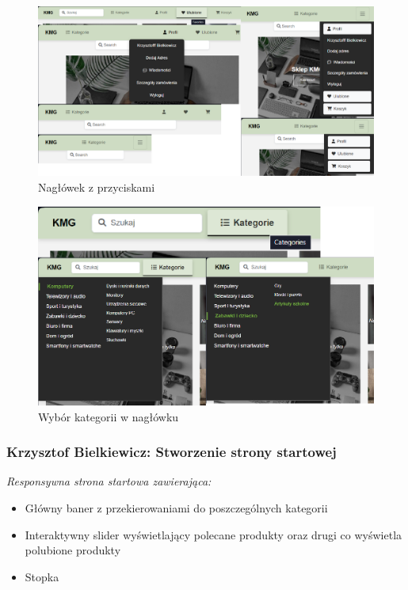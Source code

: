 \documentclass[12pt,a4paper,oneside]{article}
\theoremstyle{definition}
\numberwithin{equation}{section}
\begin{document}
\begin{figure}[H]
    \centering
    \includegraphics[width=0.9\columnwidth]{images/krzysztofBImages/header.png}
    \caption{Nagłówek z przyciskami}
    \label{header}
\end{figure}

\begin{figure}[H]
    \centering
    \includegraphics[width=0.9\columnwidth]{images/krzysztofBImages/header-categories.png}
    \caption{Wybór kategorii w nagłówku}
    \label{header-categories}
\end{figure}



\subsubsection{Krzysztof Bielkiewicz: Stworzenie strony startowej}
\label{1.3.2}
\textit{Responsywna strona startowa zawierająca:}
    \begin{itemize}
        \item Główny baner z przekierowaniami do poszczególnych kategorii
        \item Interaktywny slider wyświetlający polecane produkty oraz drugi co wyświetla polubione produkty
        \item Stopka
    \end{itemize}
\end{document}
